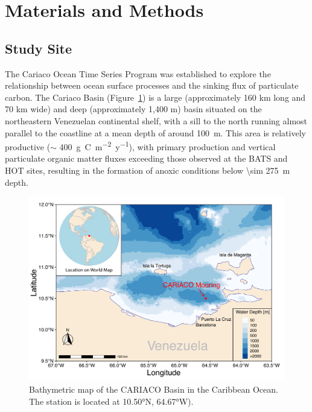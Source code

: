 \documentclass[draft]{agujournal2019}
\begin{document}
   


\section{Materials and Methods}
%
\subsection{Study Site}
    The Cariaco Ocean Time Series Program was established to explore the relationship between ocean surface processes and the sinking flux of particulate carbon. The Cariaco Basin (Figure~\ref{fig:map}) is a large (approximately 160 km long and 70 km wide) and deep (approximately 1,400 m) basin situated on the northeastern Venezuelan continental shelf, with a sill to the north running almost parallel to the coastline at a mean depth of around \qty{100}{m}. This area is relatively productive ($\sim$ \qty{400}{g.C.m^{-2}.y^{-1}}), with primary production and vertical particulate organic matter fluxes exceeding those observed at the BATS and HOT sites, resulting in the formation of anoxic conditions below \qty{\sim 275}{m} depth.


\begin{figure}
\noindent\includegraphics[width=\textwidth]{fig/Map_CAR.pdf}
\caption{Bathymetric map of the CARIACO Basin in the Caribbean Ocean. The station is located at \ang{10.50}N, \ang{64.67}W).}
\label{fig:map}
\end{figure}
\end{document}
